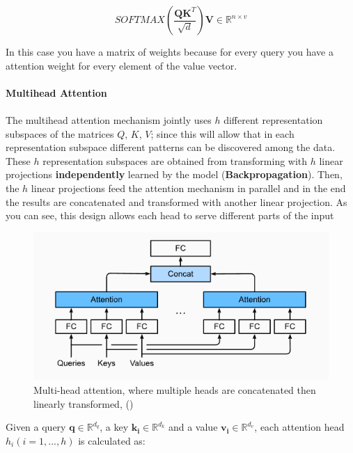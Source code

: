 \begin{equation}
    SOFTMAX(\frac{\mathbf{Q}\mathbf{K}^{T}}{\sqrt{d}})\mathbf{V} \in \mathbb{R}^{n \times v}
\end{equation}

In this case you have a matrix of weights because for every query you have a attention weight for every element of the value vector. 
\\\\
\textbf{Multihead Attention}
\\\\
The multihead attention mechanism jointly uses $h$ different representation subspaces of the matrices $Q$, $K$, $V$; since this will allow that in each representation subspace different patterns can be discovered among the data. These $h$ representation subspaces are obtained from transforming with $h$ linear projections \textbf{independently} learned by the model (\textbf{Backpropagation}). Then, the $h$ linear projections feed the attention mechanism in parallel and in the end the results are concatenated and transformed with another linear projection. As you can see, this design allows each head to serve different parts of the input

\newpage

\begin{figure}[h!]
    \centering%
    \includegraphics[width=\linewidth]{Figures/background/Multihead.png}
    \caption{Multi-head attention, where multiple heads are concatenated then linearly transformed, (\cite{goodfellow2016dive})}
    \label{fig:attention}
\end{figure}



Given a query $\mathbf{q} \in \mathbb{R}^{d_{q}}$, a key $\mathbf{k_{i}} \in \mathbb{R}^{d_{k}}$ and a value $\mathbf{v_{i}} \in \mathbb{R}^{d_{v}}$, each attention head $h_{i}(i=1,...,h)$ is calculated as:

